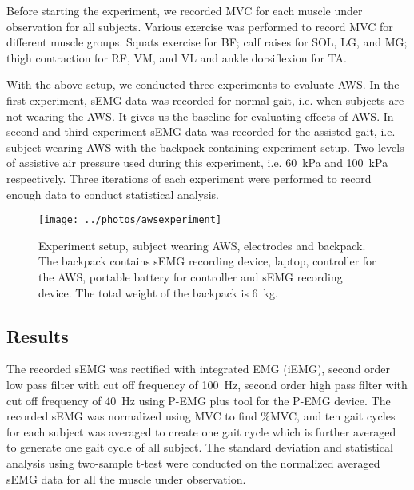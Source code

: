 \documentclass[letterpaper, 10 pt, conference]{ieeeconf}  %
\begin{document}
Before starting the experiment, we recorded MVC for each muscle under observation for all subjects. Various exercise was performed to record MVC for different muscle groups. Squats exercise for BF; calf raises for SOL, LG, and MG; thigh contraction for RF, VM, and VL and ankle dorsiflexion for TA. 

With the above setup, we conducted three experiments to evaluate AWS. In the first experiment, sEMG data was recorded for normal gait, i.e. when subjects are not wearing the AWS. It gives us the baseline for evaluating effects of AWS. In second and third experiment sEMG data was recorded for the assisted gait, i.e. subject wearing AWS with the backpack containing experiment setup. Two levels of assistive air pressure used during this experiment, i.e. \SI{60}{\kilo\pascal} and \SI{100}{\kilo\pascal} respectively. Three iterations of each experiment were performed to record enough data to conduct statistical analysis. 


\begin{figure}
	\centering
	\texttt{[image: ../photos/awsexperiment]}
	\caption{Experiment setup, subject wearing AWS, electrodes and backpack. The backpack contains sEMG recording device, laptop, controller for the AWS, portable battery for controller and sEMG recording device. The total weight of the backpack is \SI{6}{\kilogram}.}
	\label{fig:experimentsetup}
\end{figure}

\subsection{Results}

The recorded sEMG was rectified with integrated EMG (iEMG), second order low pass filter with cut off frequency of \SI{100}{\hertz}, second order high pass filter with cut off frequency of \SI{40}{\hertz} using P-EMG plus tool for the P-EMG device. The recorded sEMG was normalized using MVC to find \%MVC, and ten gait cycles for each subject was averaged to create one gait cycle which is further averaged to generate one gait cycle of all subject. The standard deviation and statistical analysis using two-sample t-test were conducted on the normalized averaged sEMG data for all the muscle under observation.
\end{document}
